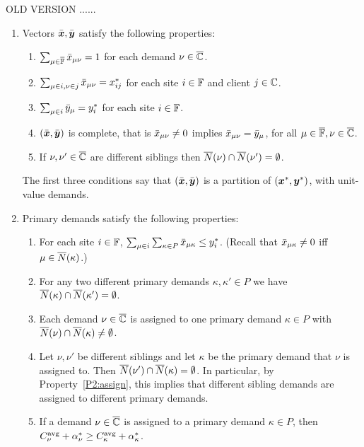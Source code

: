 \documentclass[11pt]{article}
\begin{document}
OLD VERSION ......

\begin{enumerate}
      \renewcommand{\theenumi}{P\arabic{enumi}}
      \renewcommand{\labelenumi}{(\theenumi)}
      \renewcommand{\theenumii}{(\alph{enumii})}
      \renewcommand{\labelenumii}{\theenumii}

\item Vectors $\bar{\boldsymbol{x}},\bar{\boldsymbol{y}}$ satisfy the following properties:
%
  \begin{enumerate}
	\item \label{P1:one} 
          $\sum_{\mu\in\overline{\mathbb{F}}} {\bar x}_{\mu\nu} = 1$ for each demand $\nu\in\overline{\mathbb{C}}$. 
	\item \label{P1:xij} $\sum_{\mu\in i, \nu\in j} {\bar x}_{\mu\nu}
          = x^\ast_{ij}$ for each site $i\in\mathbb{F}$ and client $j\in\mathbb{C}$.
	\item \label{P1:yi}
          $\sum_{\mu\in i} {\bar y}_{\mu} = y^\ast_i$ for each site $i\in\mathbb{F}$.
	\item \label{P1:complete}
          $(\bar{\boldsymbol{x}},\bar{\boldsymbol{y}})$ is complete, that is ${\bar x}_{\mu\nu}\neq 0$ implies
				${\bar x}_{\mu\nu} = {\bar y}_{\mu}$, for all 
						$\mu\in\overline{\mathbb{F}}, \nu\in\overline{\mathbb{C}}$.
	\item \label{P1:siblings disjoint}
		 If $\nu,\nu'\in\overline{\mathbb{C}}$ are different siblings
			then ${\overline{N}}(\nu)\cap {\overline{N}}(\nu') = \emptyset$.
  \end{enumerate}
%
  The first three conditions say that $(\bar{\boldsymbol{x}},\bar{\boldsymbol{y}})$ is
  a partition of $(\boldsymbol{x}^\ast,\boldsymbol{y}^\ast)$, with unit-value
  demands. 

\item Primary demands satisfy the following properties:
%
\begin{enumerate}
%
\item \label{P2:yi} For each site $i\in\mathbb{F}$, $ \sum_{\mu\in i}\sum_{\kappa\in P}{\bar x}_{\mu\kappa} \leq y_i^\ast$.
	(Recall that ${\bar x}_{\mu\kappa}\neq 0$ iff $\mu\in {\overline{N}}(\kappa)$.)
%
	\item\label{P2:disjoint}  For any two different primary demands $\kappa,\kappa'\in P$ we have
	${\overline{N}}(\kappa)\cap {\overline{N}}(\kappa') = \emptyset$.
%
	\item \label{P2:assign} Each demand $\nu\in\overline{\mathbb{C}}$ is assigned
        to one primary demand $\kappa\in P$ with  ${\overline{N}}(\nu) \cap {\overline{N}}(\kappa) \neq \emptyset$.
%
      \item \label{P2:diff} 
Let $\nu,\nu'$ be different siblings and let $\kappa$ be the primary demand that $\nu$ is assigned to.
Then ${\overline{N}}(\nu')\cap {\overline{N}}(\kappa) = \emptyset$. In particular, by Property~\ref{P2:assign},
this implies that different sibling demands are assigned to different primary demands.
%
      \item \label{P2:cost} If a demand $\nu\in\overline{\mathbb{C}}$
        is assigned to a primary demand $\kappa\in P$, then
        $C^{{\mbox{\scriptsize\rm avg}}}_{\nu}+\alpha_{\nu}^\ast \geq
        C^{{\mbox{\scriptsize\rm avg}}}_{\kappa}+\alpha_{\kappa}^\ast$.
\end{enumerate}

\end{enumerate}
\end{document}
